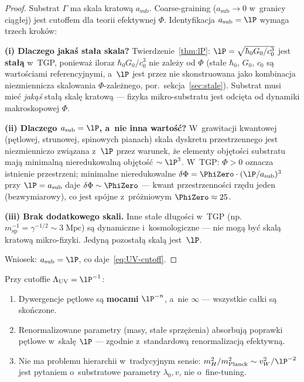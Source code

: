 \begin{proof}
Substrat $\Gamma$ ma skala kratową $a_{\mathrm{sub}}$.
Coarse-graining ($a_{\mathrm{sub}} \to 0$ w~granicy ciągłej)
jest cutoffem dla teorii efektywnej $\Phi$.
Identyfikacja $a_{\mathrm{sub}} = \lP$ wymaga trzech kroków:

\textbf{(i) Dlaczego jakaś stała skala?}
Twierdzenie~\ref{thm:lP}: $\lP = \sqrt{\hbar_0 G_0/c_0^3}$ jest
\textbf{stałą} w~TGP, ponieważ iloraz $\hbar_0 G_0/c_0^3$ nie zależy
od $\Phi$ (stałe $\hbar_0$, $G_0$, $c_0$ są wartościami referencyjnymi,
a~$\lP$ jest przez nie skonstruowana jako kombinacja niezmiennicza
skalowania $\Phi$-zależnego, por.\ sekcja~\ref{sec:stale}).
Substrat musi mieć \emph{jakąś} stałą skalę kratową --- fizyka
mikro-substratu jest odcięta od dynamiki makroskopowej $\Phi$.

\textbf{(ii) Dlaczego $a_{\mathrm{sub}} = \lP$, a~nie inna wartość?}
W~grawitacji kwantowej (pętlowej, strunowej, spinowych pianach)
skala dyskretu przestrzennego jest niezmienniczo związana z~$\lP$
przez warunek, że elementy objętości substratu mają minimalną
nieredukowalną objętość $\sim \lP^3$.
W~TGP: $\Phi > 0$ oznacza istnienie przestrzeni; minimalne
nieredukowalne $\delta\Phi = \PhiZero \cdot (\lP/a_{\mathrm{sub}})^3$
przy $\lP = a_{\mathrm{sub}}$ daje $\delta\Phi \sim \PhiZero$ ---
kwant przestrzenności rzędu jeden (bezwymiarowy), co jest
spójne z~próżniowym $\PhiZero \approx 25$.

\textbf{(iii) Brak dodatkowego skali.}
Inne stałe długości w~TGP (np.\ $m_{\mathrm{sp}}^{-1} = \gamma^{-1/2}
\sim 3\;\mathrm{Mpc}$) są dynamiczne i~kosmologiczne --- nie mogą
być skalą kratową mikro-fizyki. Jedyną pozostałą skalą jest~$\lP$.

Wniosek: $a_{\mathrm{sub}} = \lP$, co daje~\eqref{eq:UV-cutoff}.
\end{proof}

\begin{corollary}\label{cor:finite-renorm}
Przy cutoffie $\Lambda_{\mathrm{UV}} = \lP^{-1}$:
\begin{enumerate}[nosep]
    \item Dywergencje pętlowe są \textbf{mocami} $\lP^{-n}$,
          a~nie $\infty$ --- wszystkie całki są skończone.
    \item Renormalizowane parametry (masy, stałe sprzężenia)
          absorbują poprawki pętlowe w~skalę $\lP$ --- zgodnie
          z~standardową renormalizacją efektywną.
    \item Nie ma problemu hierarchii w~tradycyjnym sensie:
          $m_H^2 / m_{\mathrm{Planck}}^2 \sim v_W^2/\lP^{-2}$
          jest pytaniem o~substratowe parametry $\lambda_0, v$,
          nie o~fine-tuning.
\end{enumerate}
\end{corollary}

